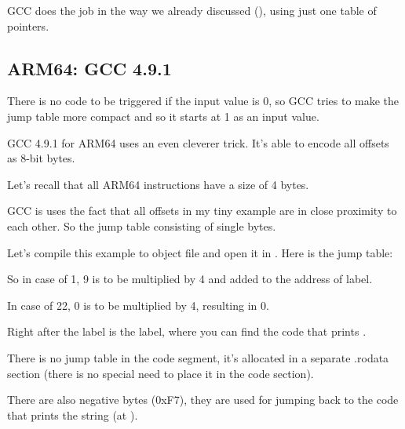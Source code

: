 GCC does the job in the way we already discussed (), using just one table of pointers.

\subsection{ARM64: \Optimizing GCC 4.9.1}

There is no code to be triggered if the input value is 0, so GCC tries to make the jump table more compact
and so it starts at 1 as an input value.

GCC 4.9.1 for ARM64 uses an even cleverer trick.
It's able to encode all offsets as 8-bit bytes.

Let's recall that all ARM64 instructions have a size of 4 bytes.

GCC is uses the fact that all offsets in my tiny example are in close proximity to each other.
So the jump table consisting of single bytes.



Let's compile this example to object file and open it in \IDA. Here is the jump table:



So in case of 1, 9 is to be multiplied by 4 and added to the address of  label.

In case of 22, 0 is to be multiplied by 4, resulting in 0. 

Right after the  label is the  label, where you can find the code that prints .

There is no jump table in the code segment, it's allocated in a separate .rodata section 
(there is no special need to place it in the code section).

There are also negative bytes (0xF7), they are used for jumping back to the code that prints the  string (at ).

